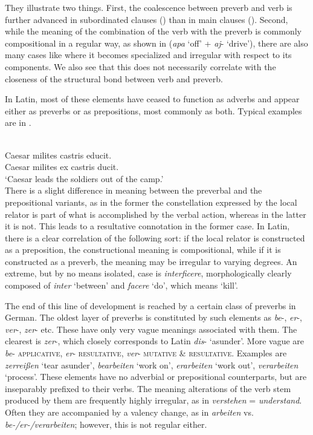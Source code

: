 \noindent They illustrate two things. First, the coalescence between preverb and verb is further advanced in subordinated clauses () than in main clauses (). Second, while the meaning of the combination of the verb with the preverb is commonly compositional in a regular way, as shown in  (\textit{apa} ‘off’ + \textit{aj}{}- ‘drive’), there are also many cases like  where it becomes specialized and irregular with respect to its components. We also see that this does not necessarily correlate with the closeness of the structural bond between verb and preverb.

In Latin, most of these elements have ceased to function as adverbs and appear either as preverbs or as prepositions, most commonly as both. Typical examples are in .

\ea\label{ex:E80}
 \\
 \ea 
 Caesar milites castris educit.\\

\ex Caesar milites ex castris ducit.\\
\glt ‘Caesar leads the soldiers out of the camp.’\\
\z
\z
\noindent There is a slight difference in meaning between the preverbal and the prepositional variants, as in the former the constellation expressed by the local relator is part of what is accomplished by the verbal action, whereas in the latter it is not. This leads to a resultative connotation in the former case. In Latin, there is a clear correlation of the following sort: if the local relator is constructed as a preposition, the constructional meaning is compositional, while if it is constructed as a preverb, the meaning may be irregular to varying degrees. An extreme, but by no means isolated, case is \textit{interficere}, morphologically clearly composed of \textit{inter} ‘between’ and \textit{facere} ‘do’, which means ‘kill’.

The end of this line of development is reached by a certain class of preverbs in German. The oldest layer of preverbs is constituted by such elements as \textit{be}{}-, \textit{er}{}-, \textit{ver}{}-, \textit{zer}{}- etc. These have only very vague meanings associated with them. The clearest is \textit{zer}{}-, which closely corresponds to Latin \textit{dis}{}- ‘asunder’. More vague are \textit{be}{}- \textsc{applicative}, \textit{er}{}- \textsc{resultative}, \textit{ver}{}- \textsc{mutative} \& \textsc{resultative}. Examples are \textit{zerreißen} ‘tear asunder’, \textit{bearbeiten} ‘work on’, \textit{erarbeiten} ‘work out’, \textit{verarbeiten} ‘process’. These elements have no adverbial or prepositional counterparts, but are inseparably prefixed to their verbs. The meaning alterations of the verb stem produced by them are frequently highly irregular, as in \textit{verstehen} = \textit{understand}. Often they are accompanied by a valency change, as in \textit{arbeiten} vs. \textit{be-/er-/verarbeiten}; however, this is not regular either.

